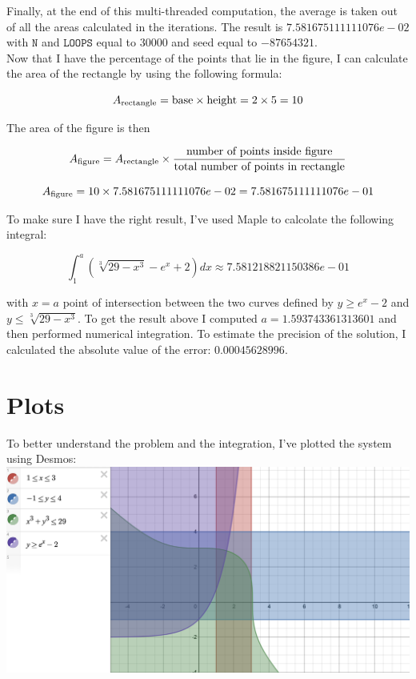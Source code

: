 \documentclass{article}
\newcommand{\code}{\texttt}
\begin{document}
Finally, at the end of this multi-threaded computation, the average is taken out of all the areas calculated in the iterations. The result is $7.581675111111076e-02$ with $\code{N}$ and $\code{LOOPS}$ equal to 30000 and seed equal to $-87654321$.\\

Now that I have the percentage of the points that lie in the figure, I can calculate the area of the rectangle by using the following formula: 

$$A_{\textnormal{rectangle}}= \textnormal{base}\times \textnormal{height}=2\times5=10$$

The area of the figure is then

$$A_{\textnormal{figure}}=A_{\textnormal{rectangle}}\times \frac{\textnormal{number of points inside figure}}{\textnormal{total number of points in rectangle}}$$

$$A_{\textnormal{figure}}=10\times 7.581675111111076e-02=7.581675111111076e-01$$

To make sure I have the right result, I've used Maple to calcolate the following integral:

$$
\int_1^{a} (\sqrt[3]{29-x^3}-e^x+2)dx\approx 7.581218821150386e-01
$$

with $x=a$ point of intersection between the two curves defined by $y\ge e^x-2$ and $y\le \sqrt[3]{29-x^3}$. To get the result above I computed $a=1.593743361313601$ and then performed numerical integration. To estimate the precision of the solution, I calculated the absolute value of the error: $0.00045628996$.

\section{Plots}
To better understand the problem and the integration, I've plotted the system using Desmos:\\

\includegraphics[width=\textwidth,height=\textheight,keepaspectratio]{desmos.png}
\end{document}
